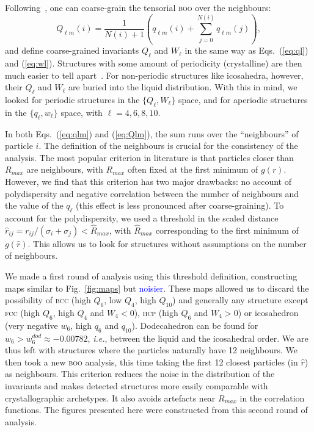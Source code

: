 Following~\citet{Lechner2008}, one can coarse-grain the tensorial \textsc{boo} over the neighbours:
\begin{equation}
	Q_{\ell m}(i) = \frac{1}{N(i)+1}\left( q_{\ell m}(i) +  \sum_{j=0}^{N(i)} q_{\ell m}(j)\right), 
	\label{eq:Qlm}
\end{equation}
and define coarse-grained invariants $Q_\ell$ and $W_\ell$ in the same way as Eqs.~(\ref{eq:ql}) and (\ref{eq:wl}). Structures with some amount of periodicity (crystalline) are then much easier to tell apart~\citep{Lechner2008}. For non-periodic structures like icosahedra, however, their $Q_\ell$ and $W_\ell$ are buried into the liquid distribution. With this in mind, we looked for periodic structures in the $\lbrace Q_\ell, W_\ell\rbrace$ space, and for aperiodic structures in the $\lbrace q_\ell, w_\ell\rbrace$ space, with $\ell=4,6,8,10$.

In both Eqs.~(\ref{eq:qlm}) and (\ref{eq:Qlm}), the sum runs over the ``neighbours'' of particle $i$. The definition of the neighbours is crucial for the consistency of the analysis. The most popular criterion in literature is that particles closer than $R_{max}$ are neighbours, with $R_{max}$ often fixed at the first minimum of $g(r)$. However, we find that this criterion has two major drawbacks: no account of polydispersity and negative correlation between the number of neighbours and the value of the $q_\ell$ (this effect is less pronounced after coarse-graining). To account for the polydispersity, we used a threshold in the scaled distance $\hat{r}_{i j} = r_{i j} /(\sigma_i+\sigma_j) < \hat{R}_{max}$, with $\hat{R}_{max}$ corresponding to the first minimum of $g(\hat{r})$. This allows us to look for structures without assumptions on the number of neighbours. 

We made a first round of analysis using this threshold definition, constructing maps similar to Fig.~\ref{fig:maps} but \textcolor{blue}{noisier}. These maps allowed us to discard the possibility of \textsc{bcc} (high $Q_6$, low $Q_4$, high $Q_{10}$) and generally any structure except \textsc{fcc} (high $Q_6$, high $Q_4$ and $W_4<0$), \textsc{hcp} (high $Q_6$ and $W_4>0$) or icosahedron (very negative $w_6$, high $q_6$ and $q_{10}$). Dodecahedron can be found for $w_6>w_6^{dod}\approx -0.00782$, \emph{i.e.}, between the liquid and the icosahedral order. We are thus left with structures where the particles naturally have 12 neighbours. We then took a new \textsc{boo} analysis, this time taking the first 12 closest particles (in $\hat{r}$) as neighbours. This criterion reduces the noise in the distribution of the invariants and makes detected structures more easily comparable with crystallographic archetypes. It also avoids artefacts near $R_{max}$ in the correlation functions. The figures presented here were constructed from this second round of analysis.

